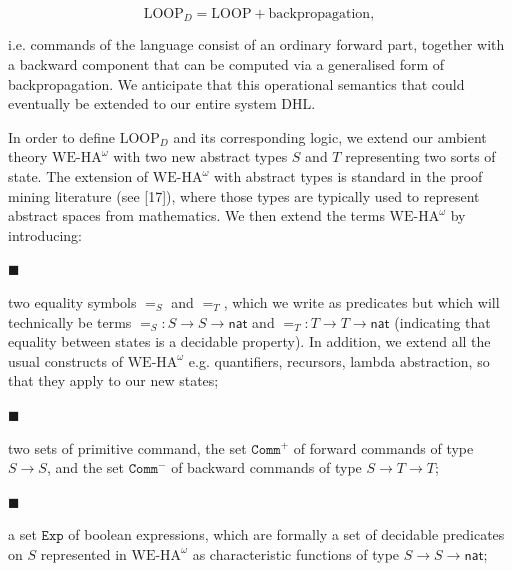 \documentclass[10pt,a4paper]{article}
\begin{document}
\par  \quad  \[\mathrm{LOOP}_{D}=\mathrm{LOOP}+\text{backpropagation},\]\quad  \quad  
  
i.e. commands of the language consist of an ordinary forward part, together with a backward component that can be computed via a generalised form of backpropagation. We anticipate that this operational semantics that could eventually be extended to our entire system $\mathrm{DHL}$.\par
 
 
 
In order to define $\mathrm{LOOP}_{D}$ and its corresponding logic, we extend our ambient theory $\mathrm{WE}\mbox{-}\mathrm{HA}^{\omega}$ with two new abstract types $S$ and $T$ representing two sorts of state. The extension of $\mathrm{WE}\mbox{-}\mathrm{HA}^{\omega}$ with abstract types is standard in the proof mining literature (see [17]), where those types are typically used to represent abstract spaces from mathematics. We then extend the terms $\mathrm{WE}\mbox{-}\mathrm{HA}^{\omega}$ by introducing:\par
  
\par\noindent  $\blacksquare$ 
 
two equality symbols $=_{S}$ and $=_{T}$, which we write as predicates but which will technically be terms $=_{S}:S\to S\to\mathsf{nat}$ and $=_{T}:T\to T\to\mathsf{nat}$ (indicating that equality between states is a decidable property). In addition, we extend all the usual constructs of $\mathrm{WE}\mbox{-}\mathrm{HA}^{\omega}$ e.g. quantifiers, recursors, lambda abstraction, so that they apply to our new states;\par
 
 
 
\par\noindent  $\blacksquare$ 
 
two sets of primitive command, the set $\mathtt{Comm}^{+}$ of forward commands of type $S\to S$, and the set $\mathtt{Comm}^{-}$ of backward commands of type $S\to T\to T$;\par
 
 
 
\par\noindent  $\blacksquare$ 
 
a set $\mathtt{Exp}$ of boolean expressions, which are formally a set of decidable predicates on $S$ represented in $\mathrm{WE}\mbox{-}\mathrm{HA}^{\omega}$ as characteristic functions of type $S\to S\to\mathsf{nat}$;\par
 
\end{document}
